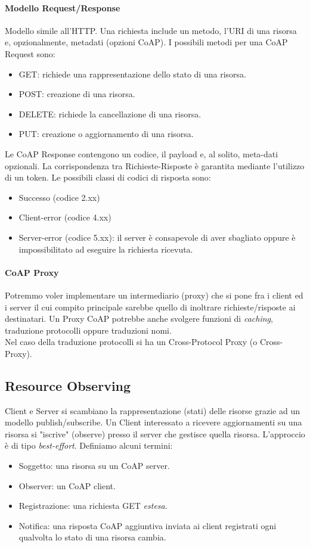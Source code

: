 \documentclass{article}
\begin{document}
\paragraph{Modello Request/Response} Modello simile all'HTTP. Una richiesta include un metodo, l'URI di una risorsa e, opzionalmente, metadati (opzioni CoAP). I possibili metodi per una CoAP Request sono:
\begin{itemize}
    \item GET: richiede una rappresentazione dello stato di una risorsa.
    \item POST: creazione di una risorsa.
    \item DELETE: richiede la cancellazione di una risorsa.
    \item PUT: creazione o aggiornamento di una risorsa.
\end{itemize}
Le CoAP Response contengono un codice, il payload e, al solito, meta-dati opzionali. La corrispondenza tra Richieste-Risposte è garantita mediante l'utilizzo di un token. Le possibili classi di codici di risposta sono:
\begin{itemize}
    \item Successo (codice 2.xx)
    \item Client-error (codice 4.xx)
    \item Server-error (codice 5.xx): il server è consapevole di aver sbagliato oppure è impossibilitato ad eseguire la richiesta ricevuta.
\end{itemize}

\paragraph{CoAP Proxy} Potremmo voler implementare un intermediario (proxy) che si pone fra i client ed i server il cui compito principale sarebbe quello di inoltrare richieste/risposte ai destinatari. Un Proxy CoAP potrebbe anche svolgere funzioni di \textit{caching}, traduzione protocolli oppure traduzioni nomi. \\
Nel caso della traduzione protocolli si ha un Cross-Protocol Proxy (o Cross-Proxy).

\subsection{Resource Observing}
Client e Server si scambiano la rappresentazione (stati) delle risorse grazie ad un modello publish/subscribe. Un Client interessato a ricevere aggiornamenti su una risorsa si "iscrive" (observe) presso il server che gestisce quella risorsa. L'approccio è di tipo \textit{best-effort}. Definiamo alcuni termini:
\begin{itemize}
    \item Soggetto: una risorsa su un CoAP server.
    \item Observer: un CoAP client.
    \item Registrazione: una richiesta GET \textit{estesa}.
    \item Notifica: una risposta CoAP aggiuntiva inviata ai client registrati ogni qualvolta lo stato di una risorsa cambia.
\end{itemize}
\end{document}
